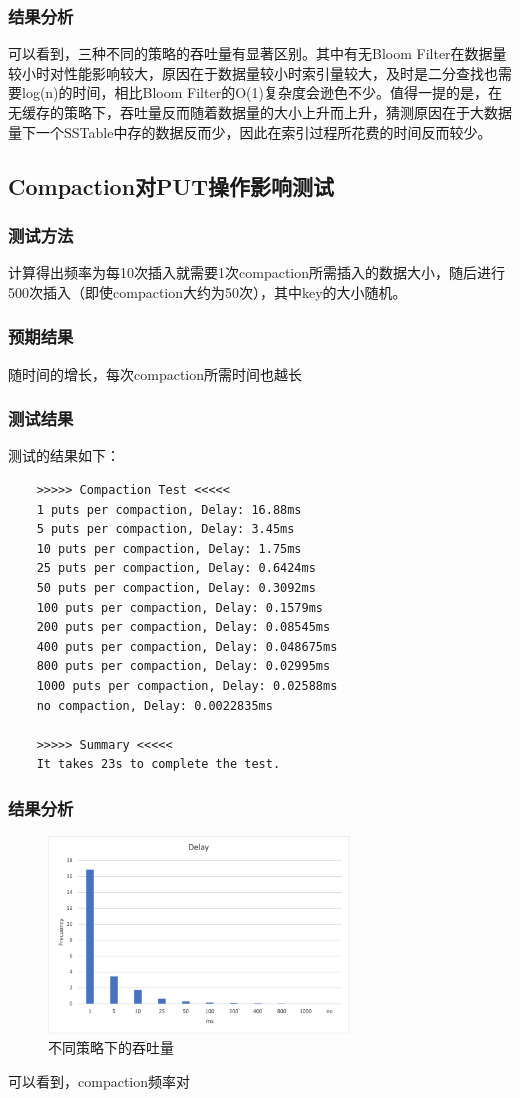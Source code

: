 \documentclass{ctexart}
\begin{document}
\subsubsection{结果分析}
可以看到，三种不同的策略的吞吐量有显著区别。其中有无Bloom Filter在数据量较小时对性能影响较大，原因在于数据量较小时索引量较大，及时是二分查找也需要log(n)的时间，相比Bloom Filter的O(1)复杂度会逊色不少。值得一提的是，在无缓存的策略下，吞吐量反而随着数据量的大小上升而上升，猜测原因在于大数据量下一个SSTable中存的数据反而少，因此在索引过程所花费的时间反而较少。


\subsection{Compaction对PUT操作影响测试}

\subsubsection{测试方法}
计算得出频率为每10次插入就需要1次compaction所需插入的数据大小，随后进行500次插入（即使compaction大约为50次），其中key的大小随机。

\subsubsection{预期结果}
随时间的增长，每次compaction所需时间也越长

\subsubsection{测试结果}
测试的结果如下：
\begin{verbatim}
    >>>>> Compaction Test <<<<<
    1 puts per compaction, Delay: 16.88ms
    5 puts per compaction, Delay: 3.45ms
    10 puts per compaction, Delay: 1.75ms
    25 puts per compaction, Delay: 0.6424ms
    50 puts per compaction, Delay: 0.3092ms
    100 puts per compaction, Delay: 0.1579ms
    200 puts per compaction, Delay: 0.08545ms
    400 puts per compaction, Delay: 0.048675ms
    800 puts per compaction, Delay: 0.02995ms
    1000 puts per compaction, Delay: 0.02588ms
    no compaction, Delay: 0.0022835ms

    >>>>> Summary <<<<<
    It takes 23s to complete the test.
\end{verbatim}

\subsubsection{结果分析}
\begin{figure}[h!]
  \centering
  \includegraphics[width=8cm]{Compaction.png}
  \caption{不同策略下的吞吐量}
\end{figure}
可以看到，compaction频率对
\end{document}
